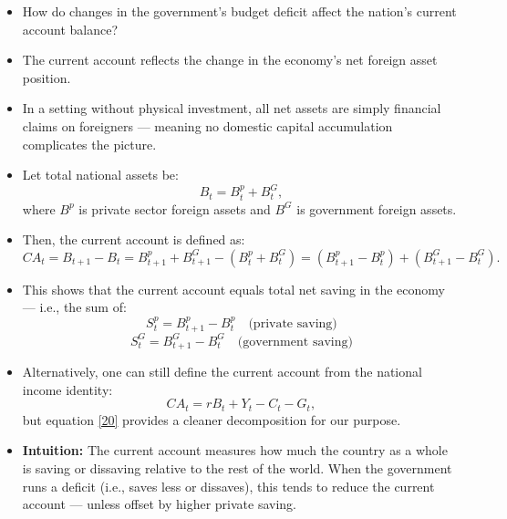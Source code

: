 \documentclass[12pt]{article}
\begin{document}
\begin{itemize}
\item How do changes in the government's budget deficit affect the nation’s current account balance?

\item The current account reflects the change in the economy’s net foreign asset position.

\item In a setting without physical investment, all net assets are simply financial claims on foreigners — meaning no domestic capital accumulation complicates the picture.

\item Let total national assets be:
\[
B_t = B_t^p + B_t^G,
\]
where \( B^p \) is private sector foreign assets and \( B^G \) is government foreign assets.

\item Then, the current account is defined as:
\[
CA_t = B_{t+1} - B_t = B_{t+1}^p + B_{t+1}^G - (B_t^p + B_t^G)
= (B_{t+1}^p - B_t^p) + (B_{t+1}^G - B_t^G). \tag{20}
\]

\item This shows that the current account equals total net saving in the economy — i.e., the sum of:
\[
S_t^p = B_{t+1}^p - B_t^p \quad \text{(private saving)}
\]
\[
S_t^G = B_{t+1}^G - B_t^G \quad \text{(government saving)}
\]

\item Alternatively, one can still define the current account from the national income identity:
\[
CA_t = r B_t + Y_t - C_t - G_t,
\]
but equation \eqref{20} provides a cleaner decomposition for our purpose.

\item \textbf{Intuition:} The current account measures how much the country as a whole is saving or dissaving relative to the rest of the world. When the government runs a deficit (i.e., saves less or dissaves), this tends to reduce the current account — unless offset by higher private saving.
\end{itemize}
\end{document}

